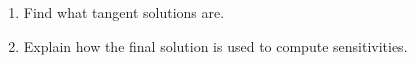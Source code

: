 \documentclass[10pt,twoside,a4paper]{article} %
\begin{document}
\begin{enumerate}
  \item Find what tangent solutions are.
  \item Explain how the final solution is used to compute sensitivities.
\end{enumerate}





%
%
%
%
%
%
%
%
%
%
%
%
%
%
%
%
%
%
%
%
\end{document}

